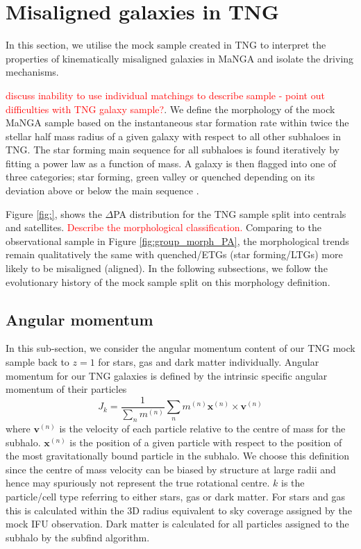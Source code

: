 \documentclass[fleqn,usenatbib]{mnras}
\newcommand{\red}[1]{{\textcolor{red}{#1}}}
\begin{document}
\section{Misaligned galaxies in TNG} \label{sec:tng_results}
In this section, we utilise the mock sample created in TNG to interpret the properties of kinematically misaligned galaxies in MaNGA and isolate the driving mechanisms. 

\red{discuss inability to use individual matchings to describe sample - point out difficulties with TNG galaxy sample?}. 
We define the morphology of the mock MaNGA sample based on the instantaneous star formation rate within twice the stellar half mass radius of a given galaxy with respect to all other subhaloes in TNG. The star forming main sequence for all subhaloes is found iteratively by fitting a power law as a function of mass. A galaxy is then flagged into one of three categories; star forming, green valley or quenched depending on its deviation above or below the main sequence \citep{pillepich2019}. 

Figure \ref{fig:}, shows the $\Delta$PA distribution for the TNG sample split into centrals and satellites. \red{Describe the morphological classification.} Comparing to the observational sample in Figure \ref{fig:group_morph_PA}, the morphological trends remain qualitatively the same with quenched/ETGs (star forming/LTGs) more likely to be misaligned (aligned). In the following subsections, we follow the evolutionary history of the mock sample split on this morphology definition. 

\subsection{Angular momentum}
In this sub-section, we consider the angular momentum content of our TNG mock sample back to $z=1$ for stars, gas and dark matter individually. Angular momentum for our TNG galaxies is defined by the intrinsic specific angular momentum of their particles
\begin{equation}
J_{k} = \frac{1}{\sum_{n} m^{(n)}} \sum_{n} m^{(n)}\boldsymbol{x}^{(n)} \times \boldsymbol{v}^{(n)}
\end{equation}
where $\boldsymbol{v}^{(n)}$ is the velocity of each particle relative to the centre of mass for the subhalo. $\boldsymbol{x}^{(n)}$ is the position of a given particle with respect to the position of the most gravitationally bound particle in the subhalo. We choose this definition since the centre of mass velocity can be biased by structure at large radii and hence may spuriously not represent the true rotational centre. $k$ is the particle/cell type referring to either stars, gas or dark matter. For stars and gas this is calculated within the 3D radius equivalent to sky coverage assigned by the mock IFU observation. Dark matter is calculated for all particles assigned to the subhalo by the subfind algorithm. 
\end{document}
